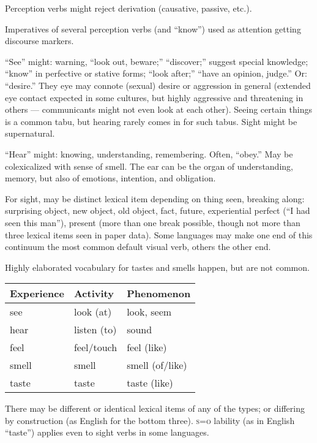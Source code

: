 \documentclass[11pt]{article}
\newcommand{\I}[1]{\textsc{#1}}   %
\begin{document}
Perception verbs might reject derivation (causative, passive, etc.).

Imperatives of several perception verbs (and ``know'') used as
attention getting discourse markers.

``See'' might: warning, ``look out, beware;'' ``discover;'' suggest
special knowledge; ``know'' in perfective or stative forms; ``look
after;'' ``have an opinion, judge.'' Or: ``desire.''  They eye may
connote (sexual) desire or aggression in general (extended eye contact
expected in some cultures, but highly aggressive and threatening in
others — communicants might not even look at each other).  Seeing
certain things is a common tabu, but hearing rarely comes in for such
tabus.  Sight might be supernatural.

``Hear'' might: knowing, understanding, remembering.  Often, ``obey.''
May be colexicalized with sense of smell.  The ear can be the organ of
understanding, memory, but also of emotions, intention, and obligation.

For sight, may be distinct lexical item depending on thing seen,
breaking along: surprising object, new object, old object, fact,
future, experiential perfect (``I had seen this man''), present (more
than one break possible, though not more than three lexical items seen
in paper data).  Some languages may make one end of this continuum the
most common default visual verb, others the other end.

Highly elaborated vocabulary for tastes and smells happen, but are not
common. 

\begin{center}
  \begin{tabular}{lll}
    Experience & Activity & Phenomenon \\
    \hline
    see & look (at) & look, seem \\
    hear & listen (to) & sound \\
    feel & feel/touch & feel (like) \\
    smell & smell & smell (of/like) \\
    taste & taste & taste (like)
  \end{tabular}
\end{center}

There may be different or identical lexical items of any of the types;
or differing by construction (as English for the bottom
three).  \I{s=o} lability (as in English ``taste'') applies even to
sight verbs in some languages.
\end{document}
